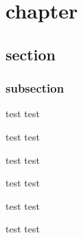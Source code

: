 \chapter{chapter}
\section{section}
\subsection{subsection}
\begin{mythm}[name]
    test
    test
\end{mythm}
\begin{mycor}[name]
    test
test
\end{mycor}
\begin{mylmm}[name]
    test
test
\end{mylmm}
\begin{myprop}[name]
    test
test
\end{myprop}
\begin{mydef}[name]
    test
test
\end{mydef}
\begin{myrmk}[name]
    test
test
\end{myrmk}